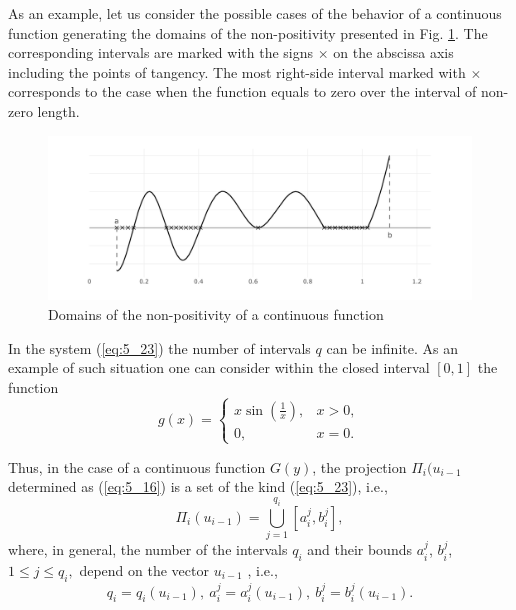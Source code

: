 As an example, let us consider the possible cases of the behavior of a continuous function generating the domains of the non-positivity presented in Fig. \ref{fig:5_3}. The corresponding intervals  are marked with  the signs $\times$  on the abscissa axis including the points of tangency. The most right-side interval marked with $\times$ corresponds to the case when the function equals to zero over the interval of non-zero length. 
\begin{figure}[t]
\centering
\includegraphics[width=1.1\linewidth]{figures/figure_5_3.pdf}
\caption{Domains of the non-positivity of a continuous function}
\label{fig:5_3}    
\end{figure}
In the system (\ref{eq:5_23}) the number of intervals $q$ can be infinite. As an example of such situation one can consider within the closed interval $[0,1]$ the function
\begin{displaymath}
g(x)=
  \begin{cases}
    x\sin(\frac{1}{x}), & x>0,\\
    0, & x=0.
  \end{cases}
\end{displaymath}

Thus, in the case of a continuous function $G(y)$, the projection $\Pi_i(u_{i-1}$ determined as  (\ref{eq:5_16}) is a set of the kind (\ref{eq:5_23}), i.e.,
\begin{equation}
\label{eq:5_24}
\Pi_i(u_{i-1})=\bigcup_{j=1}^{q_i}{[a_i^j,b_i^j]},
\end{equation}
where, in general, the number of the intervals $q_i$  and their bounds $a_i^j$, $b_i^j$, $1\leq j\leq q_i,$ depend on the vector $u_{i-1}$ , i.e.,
\begin{equation}
\label{eq:5_25}
q_i=q_i(u_{i-1}),\:a_i^j=a_i^j(u_{i-1}),\:b_i^j=b_i^j(u_{i-1}).
\end{equation}

